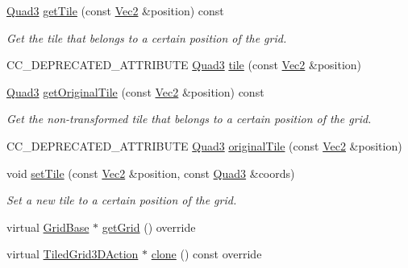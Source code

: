 \begin{DoxyCompactItemize}
\item 
\hyperlink{structQuad3}{Quad3} \hyperlink{classTiledGrid3DAction_a302f322743e028d4b4002af22490e117}{get\+Tile} (const \hyperlink{classVec2}{Vec2} \&position) const
\begin{DoxyCompactList}\small\item\em Get the tile that belongs to a certain position of the grid. \end{DoxyCompactList}\item 
C\+C\+\_\+\+D\+E\+P\+R\+E\+C\+A\+T\+E\+D\+\_\+\+A\+T\+T\+R\+I\+B\+U\+TE \hyperlink{structQuad3}{Quad3} \hyperlink{classTiledGrid3DAction_a0ba5c4fa07a2cc34fbdbf78af6e3c655}{tile} (const \hyperlink{classVec2}{Vec2} \&position)
\item 
\hyperlink{structQuad3}{Quad3} \hyperlink{classTiledGrid3DAction_a4529b2fa5b1aafecad8537985c2d7d1b}{get\+Original\+Tile} (const \hyperlink{classVec2}{Vec2} \&position) const
\begin{DoxyCompactList}\small\item\em Get the non-\/transformed tile that belongs to a certain position of the grid. \end{DoxyCompactList}\item 
C\+C\+\_\+\+D\+E\+P\+R\+E\+C\+A\+T\+E\+D\+\_\+\+A\+T\+T\+R\+I\+B\+U\+TE \hyperlink{structQuad3}{Quad3} \hyperlink{classTiledGrid3DAction_a6f627438c608ce230cbf60d7efddcfd6}{original\+Tile} (const \hyperlink{classVec2}{Vec2} \&position)
\item 
void \hyperlink{classTiledGrid3DAction_aa916f780d3f7837a9bd3d012ce1be936}{set\+Tile} (const \hyperlink{classVec2}{Vec2} \&position, const \hyperlink{structQuad3}{Quad3} \&coords)
\begin{DoxyCompactList}\small\item\em Set a new tile to a certain position of the grid. \end{DoxyCompactList}\item 
virtual \hyperlink{classGridBase}{Grid\+Base} $\ast$ \hyperlink{classTiledGrid3DAction_a6a959d99477286fe1c467560638f1321}{get\+Grid} () override
\item 
virtual \hyperlink{classTiledGrid3DAction}{Tiled\+Grid3\+D\+Action} $\ast$ \hyperlink{classTiledGrid3DAction_a689fd377cc0abae91db7def106529b53}{clone} () const override
\end{DoxyCompactItemize}
